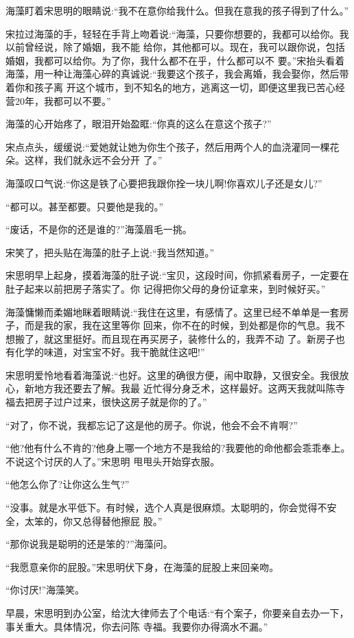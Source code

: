\documentclass[11pt,a4paper,onecolumn]{article}
\begin{document}
海藻盯着宋思明的眼睛说:``我不在意你给我什么。但我在意我的孩子得到了什么。''

宋拉过海藻的手，轻轻在手背上吻着说:``海藻，只要你想要的，我都可以给你。我以前曾经说，除了婚姻，我不能
给你，其他都可以。现在，我可以跟你说，包括婚姻，我都可以给你。为了你，我什么都不在乎，什么都可以不
要。''宋抬头看着海藻，用一种让海藻心碎的真诚说:``我要这个孩子，我会离婚，我会娶你，然后带着你和孩子离
开这个城市，到不知名的地方，逃离这一切，即便这里我已苦心经营20年，我都可以不要。''

海藻的心开始疼了，眼泪开始盈眶:``你真的这么在意这个孩子?''

宋点点头，缓缓说:``爱她就让她为你生个孩子，然后用两个人的血浇灌同一棵花朵。这样，我们就永远不会分开
了。''

海藻叹口气说:``你这是铁了心要把我跟你拴一块儿啊!你喜欢儿子还是女儿?''

``都可以。甚至都要。只要他是我的。''

``废话，不是你的还是谁的?''海藻眉毛一挑。

宋笑了，把头贴在海藻的肚子上说:``我当然知道。''

宋思明早上起身，摸着海藻的肚子说:``宝贝，这段时间，你抓紧看房子，一定要在肚子起来以前把房子落实了。你
记得把你父母的身份证拿来，到时候好买。''

海藻慵懒而柔媚地眯着眼睛说:``我住在这里，有感情了。这里已经不单单是一套房子，而是我的家，我在这里等你
回来，你不在的时候，到处都是你的气息。我不想搬了，就这里挺好。而且现在再买房子，装修什么的，我弄不动
了。新房子也有化学的味道，对宝宝不好。我干脆就住这吧!''

宋思明爱怜地看着海藻说:``也好。这里的确很方便，闹中取静，又很安全。我很放心，新地方我还要去了解。我最
近忙得分身乏术，这样最好。这两天我就叫陈寺福去把房子过户过来，很快这房子就是你的了。''

``对了，你不说，我都忘记了这是他的房子。你说，他会不会不肯啊?''

``他?他有什么不肯的?他身上哪一个地方不是我给的?我要他的命他都会乖乖奉上。不说这个讨厌的人了。''宋思明
甩甩头开始穿衣服。

``他怎么你了?让你这么生气?''

``没事。就是水平低下。有时候，选个人真是很麻烦。太聪明的，你会觉得不安全，太笨的，你又总得替他擦屁
股。''

``那你说我是聪明的还是笨的?''海藻问。

``我愿意亲你的屁股。''宋思明伏下身，在海藻的屁股上来回亲吻。

``你讨厌!''海藻笑。

早晨，宋思明到办公室，给沈大律师去了个电话:``有个案子，你要亲自去办一下，事关重大。具体情况，你去问陈
寺福。我要你办得滴水不漏。''
\end{document}
